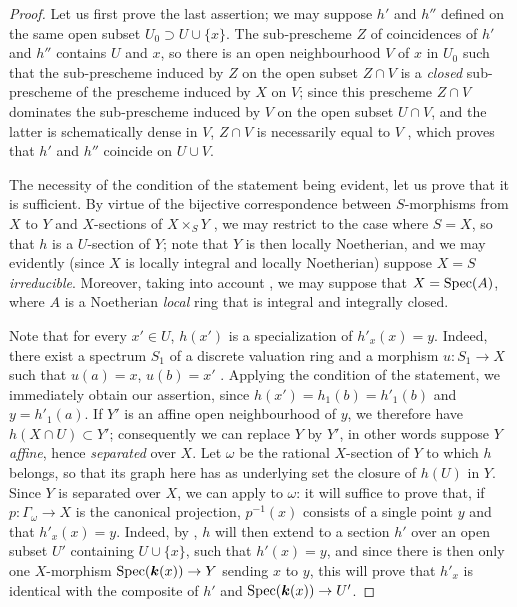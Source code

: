 \begin{proof}
Let us first prove the last assertion; we may suppose $h'$ and $h''$ defined on the same open subset $U_0\supset U\cup\{x\}$.
The sub-prescheme $Z$ of coincidences of $h'$ and $h''$  contains $U$ and $x$, so there is an open neighbourhood $V$ of $x$ in $U_0$ such that the sub-prescheme induced by $Z$ on the open subset $Z\cap V$ is a \emph{closed} sub-prescheme of the prescheme induced by $X$ on $V$; since this prescheme $Z\cap V$ dominates the sub-prescheme induced by $V$ on the open subset $U\cap V$, and the latter is schematically dense in $V$, $Z\cap V$ is necessarily equal to $V$ , which proves that $h'$ and $h''$ coincide on $U\cup V$.

The necessity of the condition of the statement being evident, let us prove that it is sufficient.
By virtue of the bijective correspondence between $S$-morphisms from $X$ to $Y$ and $X$-sections of $X\times_S Y$ , we may restrict to the case where $S=X$, so that $h$ is a $U$-section of $Y$; note that $Y$ is then locally Noetherian, and we may evidently (since $X$ is locally integral and locally Noetherian) suppose $X=S$ \emph{irreducible}.
Moreover, taking into account , we may suppose that $X=\operatorname{Spec}(A)$, where $A$ is a Noetherian \emph{local} ring that is integral and integrally closed.

Note that for every $x'\in U$, $h(x')$ is a specialization of $h'_x(x)=y$.
Indeed, there exist a spectrum $S_1$ of a discrete valuation ring and a morphism $u:S_1\to X$ such that $u(a)=x$, $u(b)=x'$ .
Applying the condition of the statement, we immediately obtain our assertion, since $h(x')=h_1(b)=h'_1(b)$ and $y=h'_1(a)$.
If $Y'$ is an affine open neighbourhood of $y$, we therefore have $h(X\cap U)\subset Y'$; consequently we can replace $Y$ by $Y'$, in other words suppose $Y$ \emph{affine}, hence \emph{separated} over $X$.
Let $\omega$ be the rational $X$-section of $Y$ to which $h$ belongs, so that its graph here has as underlying set the closure of $h(U)$ in $Y$.
Since $Y$ is separated over $X$, we can apply  to $\omega$: it will suffice to prove that, if $p:\Gamma_\omega\to X$ is the canonical projection, $p^{-1}(x)$ consists of a single point $y$ and that $h'_x(x)=y$.
Indeed, by , $h$ will then extend to a section $h'$ over an open subset $U'$ containing $U\cup\{x\}$, such that $h'(x)=y$, and since there is then only one $X$-morphism $\operatorname{Spec}(\boldsymbol{k}(x))\to Y$ sending $x$ to $y$, this will prove that $h'_x$ is identical with the composite of $h'$ and $\operatorname{Spec}(\boldsymbol{k}(x))\to U'$.


\end{proof}
